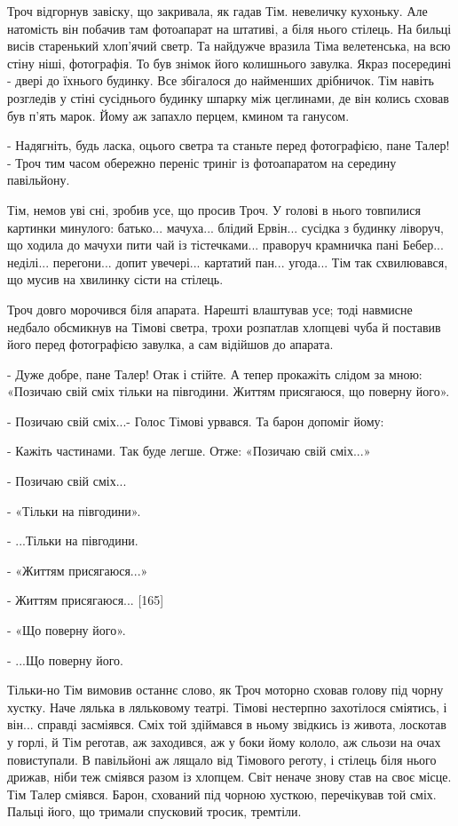 Троч відгорнув завіску, що закривала, як гадав Тім. невеличку кухоньку. Але натомість він побачив там фотоапарат на штативі, а біля нього стілець. На бильці висів старенький хлоп'ячий светр. Та найдужче вразила Тіма велетенська, на всю стіну ніші, фотографія. То був знімок його колишнього завулка. Якраз посередині - двері до їхнього будинку. Все збігалося до найменших дрібничок. Тім навіть розгледів у стіні сусіднього будинку шпарку між цеглинами, де він колись сховав був п'ять марок. Йому аж запахло перцем, кмином та ганусом.

- Надягніть, будь ласка, оцього светра та станьте перед фотографією, пане Талер! - Троч тим часом обережно переніс триніг із фотоапаратом на середину павільйону.

Тім, немов уві сні, зробив усе, що просив Троч. У голові в нього товпилися картинки минулого: батько... мачуха... блідий Ервін... сусідка з будинку ліворуч, що ходила до мачухи пити чай із тістечками... праворуч крамничка пані Бебер... неділі... перегони... допит увечері... картатий пан... угода... Тім так схвилювався, що мусив на хвилинку сісти на стілець.

Троч довго морочився біля апарата. Нарешті влаштував усе; тоді навмисне недбало обсмикнув на Тімові светра, трохи розпатлав хлопцеві чуба й поставив його перед фотографією завулка, а сам відійшов до апарата.

- Дуже добре, пане Талер! Отак і стійте. А тепер прокажіть слідом за мною: «Позичаю свій сміх тільки на півгодини. Життям присягаюся, що поверну його».

- Позичаю свій сміх...- Голос Тімові урвався. Та барон допоміг йому:

- Кажіть частинами. Так буде легше. Отже: «Позичаю свій сміх...»

- Позичаю свій сміх...

- «Тільки на півгодини».

- ...Тільки на півгодини.

- «Життям присягаюся...»

- Життям присягаюся... [165]

- «Що поверну його».

- ...Що поверну його.

Тільки-но Тім вимовив останнє слово, як Троч моторно сховав голову під чорну хустку. Наче лялька в ляльковому театрі. Тімові нестерпно захотілося сміятись, і він... справді засміявся. Сміх той здіймався в ньому звідкись із живота, лоскотав у горлі, й Тім реготав, аж заходився, аж у боки йому кололо, аж сльози на очах повиступали. В павільйоні аж лящало від Тімового реготу, і стілець біля нього дрижав, ніби теж сміявся разом із хлопцем. Світ неначе знову став на своє місце. Тім Талер сміявся. Барон, схований під чорною хусткою, перечікував той сміх. Пальці його, що тримали спусковий тросик, тремтіли.


